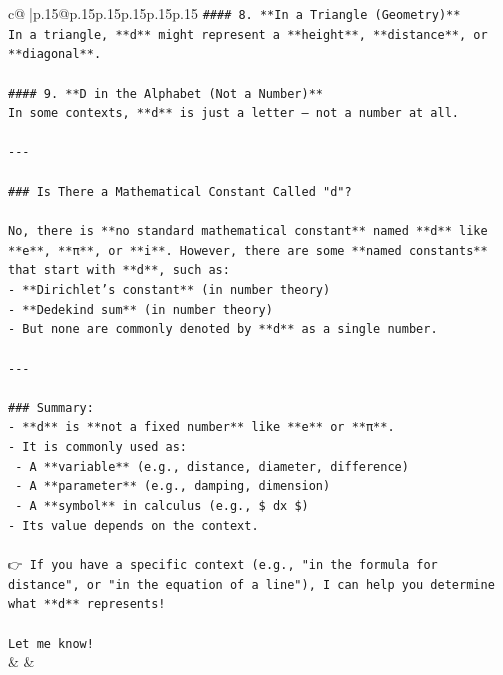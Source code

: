 \documentclass{article}
\begin{document}
{\begin{supertabular}{c@{$\;$}|p{.15\linewidth}@{}p{.15\linewidth}p{.15\linewidth}p{.15\linewidth}p{.15\linewidth}p{.15\linewidth}}
{{{\texttt{\#\#\#\# 8. **In a Triangle (Geometry)**} \\
\texttt{In a triangle, **d** might represent a **height**, **distance**, or **diagonal**.} \\
\\ 
\texttt{\#\#\#\# 9. **D in the Alphabet (Not a Number)**} \\
\texttt{In some contexts, **d** is just a letter — not a number at all.} \\
\\ 
\texttt{{-}{-}{-}} \\
\\ 
\texttt{\#\#\# Is There a Mathematical Constant Called "d"?} \\
\\ 
\texttt{No, there is **no standard mathematical constant** named **d** like **e**, **π**, or **i**. However, there are some **named constants** that start with **d**, such as:} \\
\texttt{{-} **Dirichlet's constant** (in number theory)} \\
\texttt{{-} **Dedekind sum** (in number theory)} \\
\texttt{{-} But none are commonly denoted by **d** as a single number.} \\
\\ 
\texttt{{-}{-}{-}} \\
\\ 
\texttt{\#\#\# Summary:} \\
\texttt{{-} **d** is **not a fixed number** like **e** or **π**.} \\
\texttt{{-} It is commonly used as:} \\
\texttt{  {-} A **variable** (e.g., distance, diameter, difference)} \\
\texttt{  {-} A **parameter** (e.g., damping, dimension)} \\
\texttt{  {-} A **symbol** in calculus (e.g., \$ dx \$)} \\
\texttt{{-} Its value depends on the context.} \\
\\ 
\texttt{👉 If you have a specific context (e.g., "in the formula for distance", or "in the equation of a line"), I can help you determine what **d** represents!} \\
\\ 
\texttt{Let me know!} \\
            }
        }
    }
    & & \\ \\


\end{supertabular}}
\end{document}
